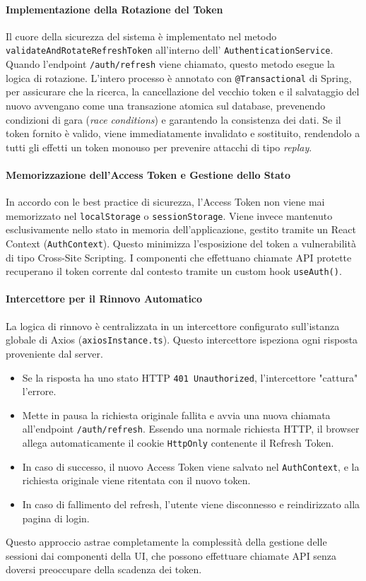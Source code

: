 \documentclass[12pt,a4paper,openright,twoside]{book}
\begin{document}
\paragraph{Implementazione della Rotazione del Token}
Il cuore della sicurezza del sistema è implementato nel metodo \texttt{validateAndRotateRefreshToken} all'interno dell' \texttt{AuthenticationService}. Quando l'endpoint \texttt{/auth/refresh} viene chiamato, questo metodo esegue la logica di rotazione. L'intero processo è annotato con \texttt{@Transactional} di Spring, per assicurare che la ricerca, la cancellazione del vecchio token e il salvataggio del nuovo avvengano come una transazione atomica sul database, prevenendo condizioni di gara (\textit{race conditions}) e garantendo la consistenza dei dati. Se il token fornito è valido, viene immediatamente invalidato e sostituito, rendendolo a tutti gli effetti un token monouso per prevenire attacchi di tipo \textit{replay}.

\paragraph{Memorizzazione dell'Access Token e Gestione dello Stato}
In accordo con le best practice di sicurezza, l'Access Token non viene mai memorizzato nel \texttt{localStorage} o \texttt{sessionStorage}. Viene invece mantenuto esclusivamente nello stato in memoria dell'applicazione, gestito tramite un React Context (\texttt{AuthContext}). Questo minimizza l'esposizione del token a vulnerabilità di tipo Cross-Site Scripting. I componenti che effettuano chiamate API protette recuperano il token corrente dal contesto tramite un custom hook \texttt{useAuth()}.

\paragraph{Intercettore per il Rinnovo Automatico}
La logica di rinnovo è centralizzata in un intercettore configurato sull'istanza globale di Axios (\texttt{axiosInstance.ts}). Questo intercettore ispeziona ogni risposta proveniente dal server.
\begin{itemize}
    \item Se la risposta ha uno stato HTTP \texttt{401 Unauthorized}, l'intercettore "cattura" l'errore.
    \item Mette in pausa la richiesta originale fallita e avvia una nuova chiamata all'endpoint \texttt{/auth/refresh}. Essendo una normale richiesta HTTP, il browser allega automaticamente il cookie \texttt{HttpOnly} contenente il Refresh Token.
    \item In caso di successo, il nuovo Access Token viene salvato nel \texttt{AuthContext}, e la richiesta originale viene ritentata con il nuovo token.
    \item In caso di fallimento del refresh, l'utente viene disconnesso e reindirizzato alla pagina di login.
\end{itemize}
Questo approccio astrae completamente la complessità della gestione delle sessioni dai componenti della UI, che possono effettuare chiamate API senza doversi preoccupare della scadenza dei token.
\end{document}
